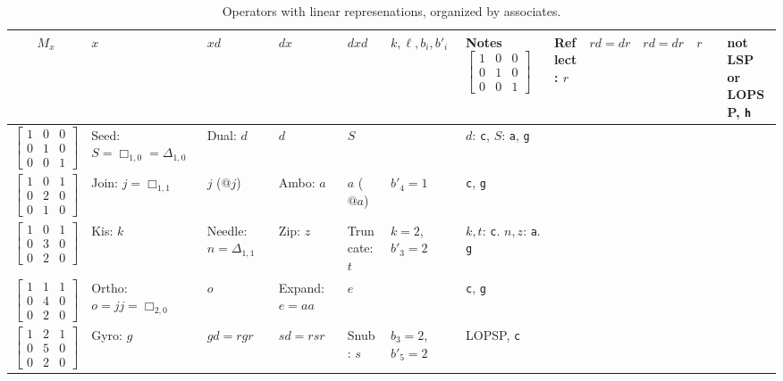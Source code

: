 \documentclass[12pt]{amsart}%
\begin{document}
\begin{longtable}{c|m{2cm}|m{2cm}|m{2cm}|m{2cm}|m{1.7cm}|m{2.5cm}}
    \caption{Operators with linear represenations, organized by associates.}
    \\
    $M_x$ & $x$ & $xd$ & $dx$ & $dxd$ & $k, \ell, b_i, b'_i$ & Notes
    \endhead \hline
    $\begin{bmatrix}
    1 & 0 & 0 \\
    0 & 1 & 0 \\
    0 & 0 & 1 \end{bmatrix}$& Reflect: $r$ & $rd=dr$ & $rd=dr$ & $r$ & & not LSP or LOPSP, \texttt{h}
    \\ \hline
    $\begin{bmatrix}
    1 & 0 & 0 \\
    0 & 1 & 0 \\
    0 & 0 & 1 \end{bmatrix}$& Seed: $S=\Box_{1,0} =\Delta_{1,0}$ & Dual: $d$ & $d$ & $S$ & & $d$: \texttt{c}, $S$: \texttt{a}, \texttt{g}
    \\ \hline
    $\begin{bmatrix}
    1 & 0 & 1 \\
    0 & 2 & 0 \\
    0 & 1 & 0 \end{bmatrix}$& Join: ${j=\Box_{1,1}}$ & $j$ ($@j$) & Ambo: $a$ & $a$ ($@a$)& $b'_4=1$ &\texttt{c}, \texttt{g}
    \\ \hline
    $\begin{bmatrix}
    1 & 0 & 1 \\
    0 & 3 & 0 \\
    0 & 2 & 0 \end{bmatrix}$& Kis: $k$ & Needle: $n =\Delta_{1,1}$ & Zip: $z$ & Truncate: $t$ & ${k=2}$, ${b'_3=2}$ &$k, t$: \texttt{c}. $n, z$: \texttt{a}. \texttt{g}
    \\ \hline
    $\begin{bmatrix}
    1 & 1 & 1 \\
    0 & 4 & 0 \\
    0 & 2 & 0 \end{bmatrix}$& Ortho: ${o=jj=\Box_{2,0}}$ & $o$ & Expand: ${e=aa}$ & $e$ & &\texttt{c}, \texttt{g}
    \\ \hline
    $\begin{bmatrix}
    1 & 2 & 1 \\
    0 & 5 & 0 \\
    0 & 2 & 0 \end{bmatrix}$& Gyro: $g$ & $gd=rgr$ & $sd=rsr$ & Snub: $s$ & ${b_3=2}$, ${b'_5=2}$ &LOPSP, \texttt{c}

\end{longtable}
\end{document}
